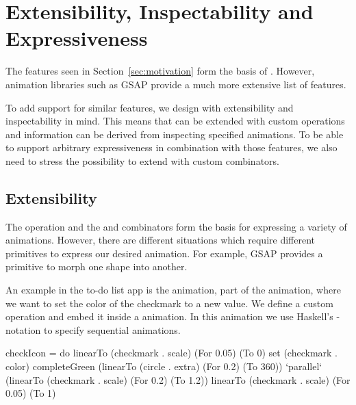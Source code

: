 \section{Extensibility, Inspectability and Expressiveness}
\label{sec:features}

The features seen in Section~\ref{sec:motivation} form the basis of \dsl{}. However, animation libraries such as GSAP provide a much more extensive list of features.

To add support for similar features, we design \dsl{} with extensibility and inspectability in mind. This means that \dsl{} can be extended with custom operations and information can be derived from inspecting specified animations. To be able to support arbitrary expressiveness in combination with those features, we also need to stress the possibility to extend \dsl{} with custom combinators.

\subsection{Extensibility}
\label{sec:customop}

The  operation and the  and  combinators form the basis for expressing a variety of animations. However, there are different situations which require different primitives to express our desired animation. For example, GSAP provides a primitive to morph one shape into another.

An example in the to-do list app is the  animation, part of the  animation, where we want to set the color of the checkmark to a new value. We define a custom  operation and embed it inside a \dsl{} animation. In this animation we use Haskell's -notation to specify sequential animations.

\begin{spec}
checkIcon = do
  linearTo (checkmark . scale) (For 0.05) (To 0)
  set (checkmark . color) completeGreen
  (linearTo (circle . extra) (For 0.2) (To 360))
    `parallel`
    (linearTo (checkmark . scale) (For 0.2) (To 1.2))
  linearTo (checkmark . scale) (For 0.05) (To 1)
\end{spec}


